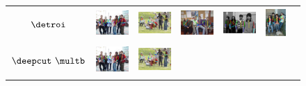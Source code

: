 \begin{figure}
  \centering
  \begin{tabular}{c c c c c c c}
    \begin{sideways}\bf \small\quad\quad $\detroi$\end{sideways}&
    \includegraphics[height=0.145\linewidth]{imgidx_0112_sticks_unary_waf.pdf}&
    \includegraphics[height=0.145\linewidth]{imgidx_0028_sticks_unary_waf.pdf}&
    \includegraphics[height=0.145\linewidth]{imgidx_0129_sticks_unary_waf.pdf}& 
    \includegraphics[height=0.145\linewidth]{imgidx_0078_sticks_unary_waf.pdf}& %
    \includegraphics[height=0.145\linewidth]{imgidx_0139_sticks_unary_waf.pdf}\\ 
    \begin{sideways}\bf \small\quad $\deepcut~\multb$\end{sideways}&
    \includegraphics[height=0.145\linewidth]{imgidx_0112_sticks_waf.pdf}&
    \includegraphics[height=0.145\linewidth]{imgidx_0028_sticks_waf.pdf}&

\end{tabular}
\end{figure}
